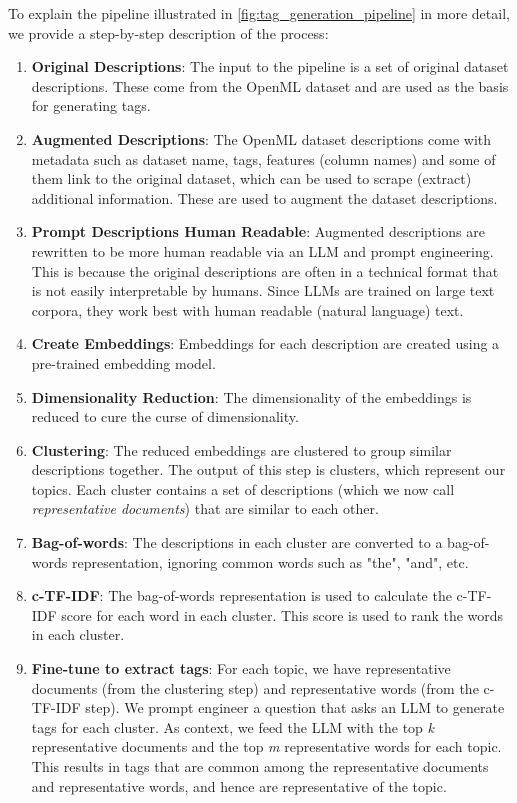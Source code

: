 To explain the pipeline illustrated in \cref{fig:tag_generation_pipeline} in more detail, we provide a step-by-step description of the process:

\begin{enumerate}
    \item \textbf{Original Descriptions}: The input to the pipeline is a set of original dataset descriptions. These come from the OpenML dataset and are used as the basis for generating tags.
    \item \textbf{Augmented Descriptions}: The OpenML dataset descriptions come with metadata such as dataset name, tags, features (column names) and some of them link to the original dataset, which can be used to scrape (extract) additional information. These are used to augment the dataset descriptions.
    \item \textbf{Prompt Descriptions Human Readable}: Augmented descriptions are rewritten to be more human readable via an LLM and prompt engineering. This is because the original descriptions are often in a technical format that is not easily interpretable by humans. Since LLMs are trained on large text corpora, they work best with human readable (natural language) text.
    \item \textbf{Create Embeddings}: Embeddings for each description are created using a pre-trained embedding model.
    \item \textbf{Dimensionality Reduction}: The dimensionality of the embeddings is reduced to cure the curse of dimensionality.
    \item \textbf{Clustering}: The reduced embeddings are clustered to group similar descriptions together. The output of this step is clusters, which represent our topics. Each cluster contains a set of descriptions (which we now call \textit{representative documents}) that are similar to each other.
    \item \textbf{Bag-of-words}: The descriptions in each cluster are converted to a bag-of-words representation, ignoring common words such as "the", "and", etc.
    \item \textbf{c-TF-IDF}: The bag-of-words representation is used to calculate the c-TF-IDF score for each word in each cluster. This score is used to rank the words in each cluster.
    \item \textbf{Fine-tune to extract tags}: For each topic, we have representative documents (from the clustering step) and representative words (from the c-TF-IDF step). We prompt engineer a question that asks an LLM to generate tags for each cluster. As context, we feed the LLM with the top \textit{k} representative documents and the top \textit{m} representative words for each topic. This results in tags that are common among the representative documents and representative words, and hence are representative of the topic.

\end{enumerate}
